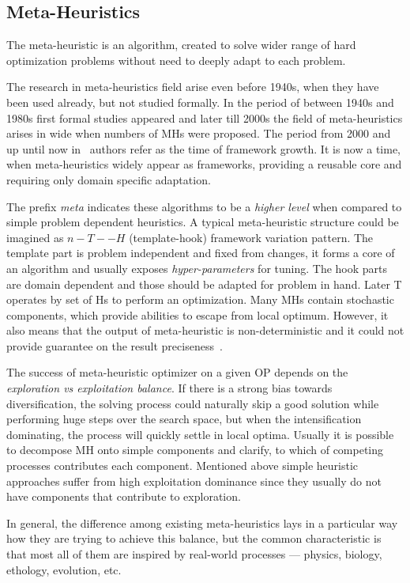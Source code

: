  
\subsection{Meta-Heuristics}
The meta-heuristic is an algorithm, created to solve wider range of hard optimization problems without need to deeply adapt to each problem.

The research in meta-heuristics field arise even before 1940s, when they have been used already, but not studied formally. In the period of between 1940s and 1980s first formal studies appeared and later till 2000s the field of meta-heuristics arises in wide when numbers of MHs were proposed. The period from 2000 and up until now in~\cite{sorensen2017history} authors refer as the time of framework growth. It is now a time, when meta-heuristics widely appear as frameworks, providing a reusable core and requiring only domain specific adaptation.

The prefix \textit{meta} indicates these algorithms to be a \textit{higher level} when compared to simple problem dependent heuristics. A typical meta-heuristic structure could be imagined as $n-T--H$ (template-hook) framework variation pattern. The template part is problem independent and fixed from changes, it forms a core of an algorithm and usually exposes \textit{hyper-parameters} for tuning. The hook parts are domain dependent and those should be adapted for problem in hand. Later T operates by set of Hs to perform an optimization.
Many MHs contain stochastic components, which provide abilities to escape from local optimum. However, it also means that the output of meta-heuristic is non-deterministic and it could not provide guarantee on the result preciseness~\cite{boussaid2013survey}.

The success of meta-heuristic optimizer on a given OP depends on the \textit{exploration vs exploitation balance}. If there is a strong bias towards diversification, the solving process could naturally skip a good solution while performing huge steps over the search space, but when the intensification dominating, the process will quickly settle in local optima. Usually it is possible to decompose MH onto simple components and clarify, to which of competing processes contributes each component. Mentioned above simple heuristic approaches suffer from high exploitation dominance since they usually do not have components that contribute to exploration.

In general, the difference among existing meta-heuristics lays in a particular way how they are trying to achieve this balance, but the common characteristic is that most all of them are inspired by real-world processes — physics, biology, ethology, evolution, etc.


